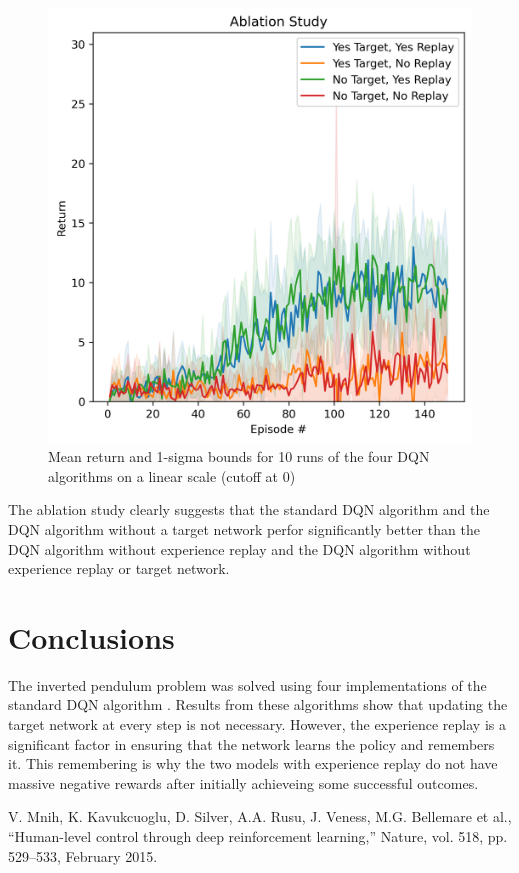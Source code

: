 \documentclass[conference]{IEEEtran}
\begin{document}
\begin{figure}[h]
\centering
\includegraphics[width=\linewidth]{../figures/results/mean_return_ablation_study_log_False.png}
\caption{Mean return and 1-sigma bounds for 10 runs of the four DQN algorithms on a linear scale (cutoff at 0)}
\label{fig:ablation_study_linear}
\end{figure}
The ablation study clearly suggests that the standard DQN algorithm and the DQN algorithm without a target network perfor significantly better than the DQN algorithm without experience replay and the DQN algorithm without experience replay or target network.

\section{Conclusions}
The inverted pendulum problem was solved using four implementations of the standard DQN algorithm \cite{b1}. Results from these algorithms show that updating the target network at every step is not necessary. However, the experience replay is a significant factor in ensuring that the network learns the policy and remembers it. This remembering is why the two models with experience replay do not have massive negative rewards after initially achieveing some successful outcomes.

\begin{thebibliography}{00}
 V. Mnih, K. Kavukcuoglu, D. Silver, A.A. Rusu, J. Veness, M.G. Bellemare et al., ``Human-level control through deep reinforcement learning,'' Nature, vol. 518, pp. 529--533, February 2015.
\end{thebibliography}
\end{document}
